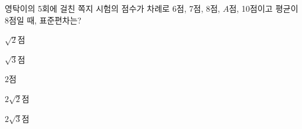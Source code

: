 영탁이의 5회에 걸친 쪽지 시험의 점수가 차례로 6점, 7점, 8점, $A$점, 10점이고 평균이 8점일 때, 표준편차는?
\begin{choices32}{\rule[-3ex]{0pt}{8ex}$\sqrt{2}$점}{\rule[-3ex]{0pt}{8ex}$\sqrt{3}$점}{\rule[-3ex]{0pt}{8ex}$2$점}{\rule[-3ex]{0pt}{8ex}$2\sqrt{2}$점}{\rule[-3ex]{0pt}{8ex}$2\sqrt{3}$점}\end{choices32}
